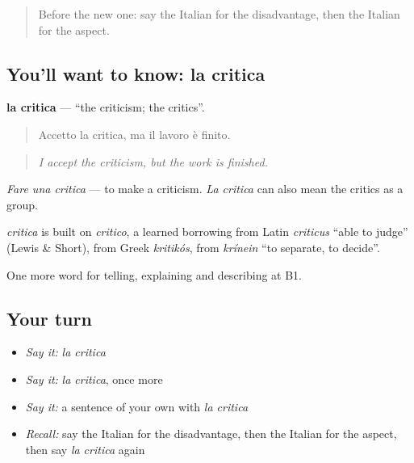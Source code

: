 \label{lesson:IT-C348-critica}



\begin{quote}
Before the new one: say the Italian for the disadvantage, then the Italian for the aspect.
\end{quote}

\subsection*{You'll want to know: la critica}
\textbf{la critica} — \textquotedblleft{}the criticism; the critics\textquotedblright{}.

\begin{quote}
Accetto la critica, ma il lavoro è finito.
\end{quote}

\begin{quote}
\emph{I accept the criticism, but the work is finished.}
\end{quote}

\emph{Fare una critica} — to make a criticism. \emph{La critica} can also mean the critics as a group.

\begin{cousinweb}
\emph{critica} is built on \emph{critico}, a learned borrowing from Latin \emph{criticus} \textquotedblleft{}able to judge\textquotedblright{} (Lewis \& Short), from Greek \emph{kritikós}, from \emph{krínein} \textquotedblleft{}to separate, to decide\textquotedblright{}.
\end{cousinweb}

\begin{grammarlens}[title={What you've built}]
One more word for telling, explaining and describing at B1.
\end{grammarlens}

\subsection*{Your turn}
\begin{itemize}
\raggedright
  \item \emph{Say it:} \emph{la critica}
  \item \emph{Say it:} \emph{la critica}, once more
  \item \emph{Say it:} a sentence of your own with \emph{la critica}
  \item \emph{Recall:} say the Italian for the disadvantage, then the Italian for the aspect, then say \emph{la critica} again
\end{itemize}

